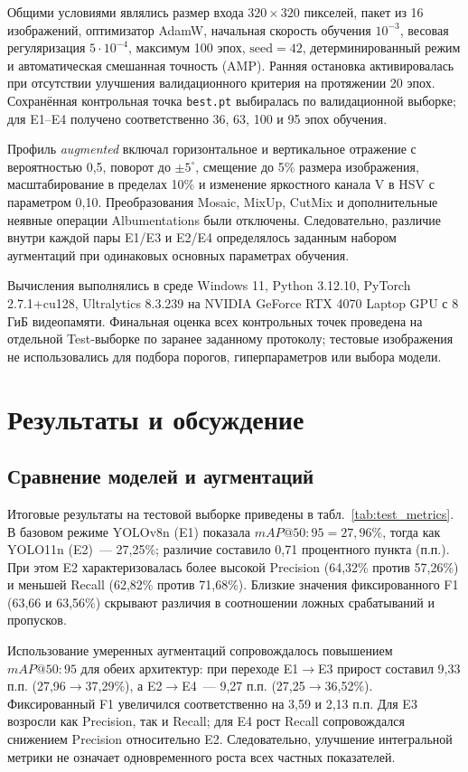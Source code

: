 \documentclass{misisarticle}
\begin{document}
Общими условиями являлись размер входа $320\times320$ пикселей, пакет из 16 изображений, оптимизатор AdamW, начальная скорость обучения $10^{-3}$, весовая регуляризация $5\cdot10^{-4}$, максимум 100 эпох, $\mathrm{seed}=42$, детерминированный режим и автоматическая смешанная точность (AMP). Ранняя остановка активировалась при отсутствии улучшения валидационного критерия на протяжении 20 эпох. Сохранённая контрольная точка \texttt{best.pt} выбиралась по валидационной выборке; для E1--E4 получено соответственно 36, 63, 100 и 95 эпох обучения.

Профиль \textit{augmented} включал горизонтальное и вертикальное отражение с вероятностью 0,5, поворот до $\pm5^\circ$, смещение до 5\% размера изображения, масштабирование в пределах 10\% и изменение яркостного канала V в HSV с параметром 0,10. Преобразования Mosaic, MixUp, CutMix и дополнительные неявные операции Albumentations были отключены. Следовательно, различие внутри каждой пары E1/E3 и E2/E4 определялось заданным набором аугментаций при одинаковых основных параметрах обучения.

Вычисления выполнялись в среде Windows 11, Python 3.12.10, PyTorch 2.7.1+cu128, Ultralytics 8.3.239 на NVIDIA GeForce RTX 4070 Laptop GPU с 8 ГиБ видеопамяти. Финальная оценка всех контрольных точек проведена на отдельной Test-выборке по заранее заданному протоколу; тестовые изображения не использовались для подбора порогов, гиперпараметров или выбора модели.

\section{Результаты и обсуждение}
\subsection{Сравнение моделей и аугментаций}
Итоговые результаты на тестовой выборке приведены в табл.~\ref{tab:test_metrics}. В базовом режиме YOLOv8n (E1) показала $mAP@50{:}95=27{,}96\%$, тогда как YOLO11n (E2)~--- 27,25\%; различие составило 0,71 процентного пункта (п.п.). При этом E2 характеризовалась более высокой Precision (64,32\% против 57,26\%) и меньшей Recall (62,82\% против 71,68\%). Близкие значения фиксированного F1 (63,66 и 63,56\%) скрывают различия в соотношении ложных срабатываний и пропусков.



Использование умеренных аугментаций сопровождалось повышением $mAP@50{:}95$ для обеих архитектур: при переходе E1$\to$E3 прирост составил 9,33 п.п. (27,96$\to$37,29\%), а E2$\to$E4~--- 9,27 п.п. (27,25$\to$36,52\%). Фиксированный F1 увеличился соответственно на 3,59 и 2,13 п.п. Для E3 возросли как Precision, так и Recall; для E4 рост Recall сопровождался снижением Precision относительно E2. Следовательно, улучшение интегральной метрики не означает одновременного роста всех частных показателей.
\end{document}
